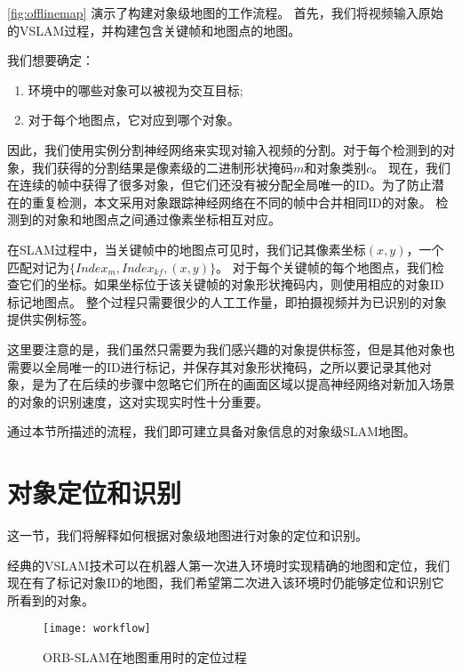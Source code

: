 \autoref{fig:offlinemap} 演示了构建对象级地图的工作流程。
首先，我们将视频输入原始的VSLAM过程\cite{mur2017orb}，并构建包含关键帧和地图点的地图。

我们想要确定：
\begin{enumerate}
	\item 环境中的哪些对象可以被视为交互目标;
	\item 对于每个地图点，它对应到哪个对象。
\end{enumerate}

因此，我们使用实例分割神经网络\cite{He_2017_ICCV}来实现对输入视频的分割。对于每个检测到的对象，我们获得的分割结果是像素级的二进制形状掩码$m$和对象类别$c$。
现在，我们在连续的帧中获得了很多对象，但它们还没有被分配全局唯一的ID。为了防止潜在的重复检测，本文采用对象跟踪神经网络在不同的帧中合并相同ID的对象。
检测到的对象和地图点之间通过像素坐标相互对应。

在SLAM过程中，当关键帧中的地图点可见时，我们记其像素坐标$(x,y)$，一个匹配对记为$\{Index_m,Index_{kf}, (x,y)\}$。
对于每个关键帧的每个地图点，我们检查它们的坐标。如果坐标位于该关键帧的对象形状掩码内，则使用相应的对象ID标记地图点。
整个过程只需要很少的人工工作量，即拍摄视频并为已识别的对象提供实例标签。

这里要注意的是，我们虽然只需要为我们感兴趣的对象提供标签，但是其他对象也需要以全局唯一的ID进行标记，并保存其对象形状掩码，之所以要记录其他对象，是为了在后续的步骤中忽略它们所在的画面区域以提高神经网络对新加入场景的对象的识别速度，这对实现实时性十分重要。

通过本节所描述的流程，我们即可建立具备对象信息的对象级SLAM地图。

\section{对象定位和识别}
这一节，我们将解释如何根据对象级地图进行对象的定位和识别。

经典的VSLAM\cite{mur2017orb,engel2014lsd}技术可以在机器人第一次进入环境时实现精确的地图和定位，我们现在有了标记对象ID的地图，我们希望第二次进入该环境时仍能够定位和识别它所看到的对象。

\begin{figure}[htbp]
  \centering
  \texttt{[image: workflow]}
  \caption{ORB-SLAM\cite{mur2017orb}在地图重用时的定位过程}
  \label{fig:localization}
\end{figure}

